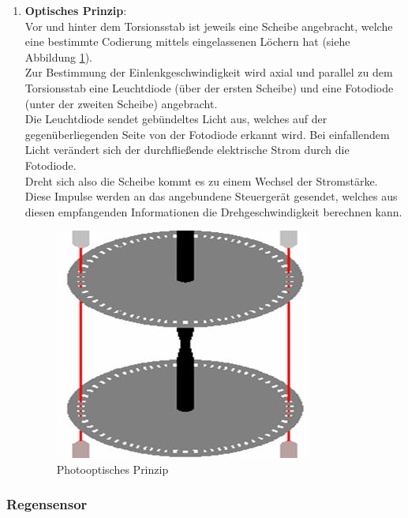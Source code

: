 \begin{flushleft}
\begin{enumerate}
	                \item \textbf{Optisches Prinzip}:\\
	
	                        Vor und hinter dem Torsionsstab ist jeweils eine Scheibe angebracht, welche eine bestimmte Codierung mittels eingelassenen Löchern hat (siehe Abbildung \ref{fig:TS05}).\\
	                        Zur Bestimmung der Einlenkgeschwindigkeit wird axial und parallel zu dem Torsionsstab eine Leuchtdiode (über der ersten Scheibe) und eine Fotodiode (unter der zweiten Scheibe) angebracht. \\
	                        Die Leuchtdiode sendet gebündeltes Licht aus, welches auf der gegenüberliegenden Seite von der Fotodiode erkannt wird. Bei einfallendem Licht verändert sich der durchfließende elektrische Strom durch die Fotodiode.\\
	                        Dreht sich also die Scheibe kommt es zu einem Wechsel der Stromstärke. Diese Impulse werden an das angebundene Steuergerät gesendet, welches aus diesen empfangenden Informationen die Drehgeschwindigkeit berechnen kann.\\
	                        
	                        \begin{figure}[h]
	                            \centering
	                            \includegraphics{photoelektrisch.png}
	                             \caption[www.kfztech.de/kfztechnik/fahrwerk/lenkung/photoelektrisch.jpg]{Photooptisches Prinzip}
	                             \label{fig:TS05}
	                        \end{figure}	
	            \end{enumerate}
	
	            \subsubsection{Regensensor}
	

\end{flushleft}
